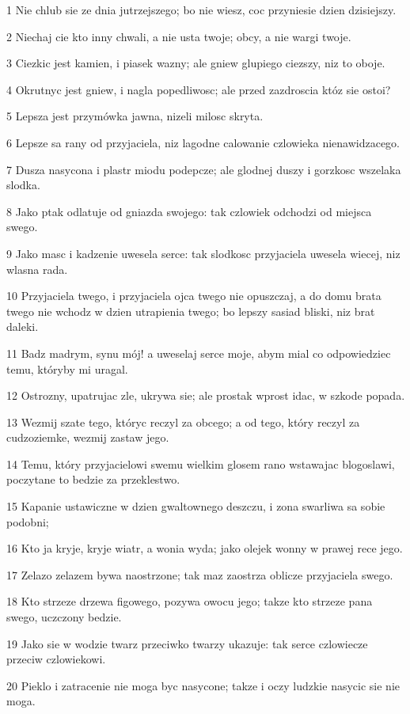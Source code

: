 \par 1 Nie chlub sie ze dnia jutrzejszego; bo nie wiesz, coc przyniesie dzien dzisiejszy.
\par 2 Niechaj cie kto inny chwali, a nie usta twoje; obcy, a nie wargi twoje.
\par 3 Ciezkic jest kamien, i piasek wazny; ale gniew glupiego ciezszy, niz to oboje.
\par 4 Okrutnyc jest gniew, i nagla popedliwosc; ale przed zazdroscia któz sie ostoi?
\par 5 Lepsza jest przymówka jawna, nizeli milosc skryta.
\par 6 Lepsze sa rany od przyjaciela, niz lagodne calowanie czlowieka nienawidzacego.
\par 7 Dusza nasycona i plastr miodu podepcze; ale glodnej duszy i gorzkosc wszelaka slodka.
\par 8 Jako ptak odlatuje od gniazda swojego: tak czlowiek odchodzi od miejsca swego.
\par 9 Jako masc i kadzenie uwesela serce: tak slodkosc przyjaciela uwesela wiecej, niz wlasna rada.
\par 10 Przyjaciela twego, i przyjaciela ojca twego nie opuszczaj, a do domu brata twego nie wchodz w dzien utrapienia twego; bo lepszy sasiad bliski, niz brat daleki.
\par 11 Badz madrym, synu mój! a uweselaj serce moje, abym mial co odpowiedziec temu, któryby mi uragal.
\par 12 Ostrozny, upatrujac zle, ukrywa sie; ale prostak wprost idac, w szkode popada.
\par 13 Wezmij szate tego, któryc reczyl za obcego; a od tego, który reczyl za cudzoziemke, wezmij zastaw jego.
\par 14 Temu, który przyjacielowi swemu wielkim glosem rano wstawajac blogoslawi, poczytane to bedzie za przeklestwo.
\par 15 Kapanie ustawiczne w dzien gwaltownego deszczu, i zona swarliwa sa sobie podobni;
\par 16 Kto ja kryje, kryje wiatr, a wonia wyda; jako olejek wonny w prawej rece jego.
\par 17 Zelazo zelazem bywa naostrzone; tak maz zaostrza oblicze przyjaciela swego.
\par 18 Kto strzeze drzewa figowego, pozywa owocu jego; takze kto strzeze pana swego, uczczony bedzie.
\par 19 Jako sie w wodzie twarz przeciwko twarzy ukazuje: tak serce czlowiecze przeciw czlowiekowi.
\par 20 Pieklo i zatracenie nie moga byc nasycone; takze i oczy ludzkie nasycic sie nie moga.
